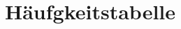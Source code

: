%
%
\glsresetall

\let\raggedsection\centering 
\chapter{Häufgkeitstabelle}\label{chap.appendix_hauefigkeitstabelle}
\let\raggedsection\raggedright 
